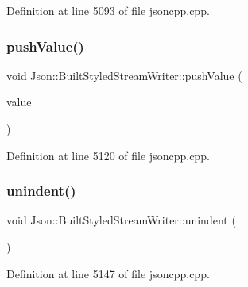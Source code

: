 Definition at line 5093 of file jsoncpp.\+cpp.

\hypertarget{struct_json_1_1_built_styled_stream_writer_a91e8535508412eea04d77c0cafdf15aa}{}\label{struct_json_1_1_built_styled_stream_writer_a91e8535508412eea04d77c0cafdf15aa} 
\subsubsection{\texorpdfstring{push\+Value()}{pushValue()}}
{\footnotesize\ttfamily void Json\+::\+Built\+Styled\+Stream\+Writer\+::push\+Value (\begin{DoxyParamCaption}\item[{\hyperlink{config_8h_a1e723f95759de062585bc4a8fd3fa4be}{J\+S\+O\+N\+C\+P\+P\+\_\+\+S\+T\+R\+I\+NG} const \&}]{value }\end{DoxyParamCaption})\hspace{0.3cm}{\ttfamily [private]}}



Definition at line 5120 of file jsoncpp.\+cpp.

\hypertarget{struct_json_1_1_built_styled_stream_writer_a0da6c6f603e00c8c6e38af553edd8c55}{}\label{struct_json_1_1_built_styled_stream_writer_a0da6c6f603e00c8c6e38af553edd8c55} 
\subsubsection{\texorpdfstring{unindent()}{unindent()}}
{\footnotesize\ttfamily void Json\+::\+Built\+Styled\+Stream\+Writer\+::unindent (\begin{DoxyParamCaption}{ }\end{DoxyParamCaption})\hspace{0.3cm}{\ttfamily [private]}}



Definition at line 5147 of file jsoncpp.\+cpp.

\hypertarget{struct_json_1_1_built_styled_stream_writer_a823cdb1afabb6b0d5f39bcd5a6a6f747}{}\label{struct_json_1_1_built_styled_stream_writer_a823cdb1afabb6b0d5f39bcd5a6a6f747} 
